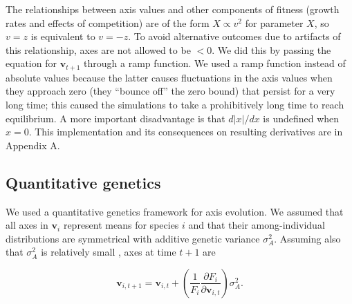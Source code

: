 The relationships between axis values and other components of fitness
(growth rates and effects of competition) are of the form
$X \propto v^2$ for parameter $X$, so $v = z$ is equivalent to $v = -z$.
To avoid alternative outcomes due to artifacts of this relationship,
axes are not allowed to be $< 0$.
We did this by passing the equation for $\mathbf{v}_{t+1}$ through a
ramp function.
We used a ramp function instead of absolute values
because the latter causes fluctuations
in the axis values when they approach zero (they ``bounce off''
the zero bound) that persist for a very long time;
this caused the simulations to take a prohibitively long time to reach
equilibrium.
A more important disadvantage is that $d \lvert x \rvert / dx$ is
undefined when $x = 0$.
This implementation and its consequences on resulting derivatives are in
Appendix A.



%


\subsection*{Quantitative genetics}

We used a quantitative genetics framework for axis evolution.
We assumed that all axes in $\mathbf{v}_i$ represent means for species $i$
and that their among-individual distributions are symmetrical with additive
genetic variance $\sigma^2_A$.
Assuming also that $\sigma^2_A$ is relatively small
\citep{Iwasa1991a,Abrams2001a,Abrams1993b}, 
axes at time $t+1$ are

\begin{equation} \label{eq:axis-change}
    \mathbf{v}_{i,t+1} = \mathbf{v}_{i,t} + \left( \frac{1}{F_i}
        \frac{\partial F_i}{\partial \mathbf{v}_{i,t}} \right) \sigma^2_A
    \textrm{.}
\end{equation}

